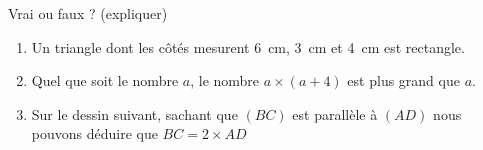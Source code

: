 
\begin{exercice}\label{exo2smath-0154}

    Vrai ou faux ? (expliquer)
    \begin{enumerate}
        \item
            Un triangle dont les côtés mesurent \SI{6}{\centi\meter}, \SI{3}{\centi\meter} et \SI{4}{\centi\meter} est rectangle.
        \item
            Quel que soit le nombre \( a\), le nombre \( a\times (a+4)\) est plus grand que \( a\).
        \item   \label{ItemITNOooXrgyJt}
            Sur le dessin suivant, sachant que \( (BC)\) est parallèle à \( (AD)\) nous pouvons déduire que \( BC=2\times AD\) 
            \begin{center}
                
            \end{center}

    \end{enumerate}

\end{exercice}
